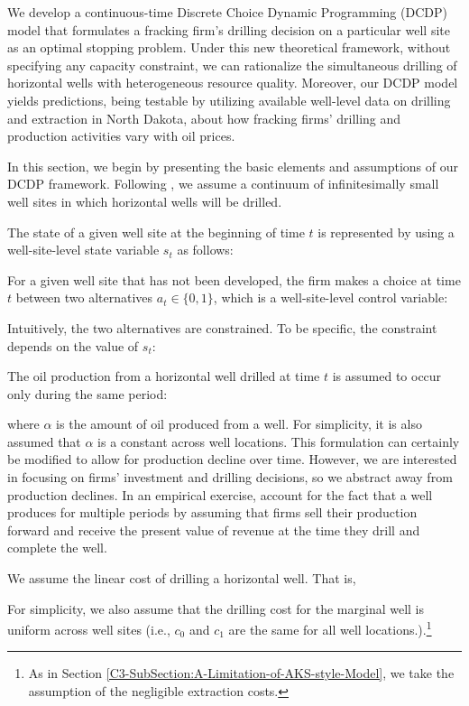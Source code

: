 We develop a continuous-time Discrete Choice Dynamic Programming (DCDP) model that formulates a fracking firm's drilling decision on a particular well site as an optimal stopping problem. Under this new theoretical framework, without specifying any capacity constraint, we can rationalize the simultaneous drilling of horizontal wells with heterogeneous resource quality.   
Moreover, our DCDP model yields predictions, being testable by utilizing available well-level data on drilling and extraction in North Dakota, about how fracking firms' drilling and production activities vary with oil prices. 

In this section, we begin by presenting the basic elements and assumptions of our DCDP framework. Following \cite{Hotelling-under-Pressure_AKS_2018}, we assume a continuum of infinitesimally small well sites in which horizontal wells will be drilled. 

The state of a given well site at the beginning of time $t$ is represented by using a well-site-level state variable $s_{t}$ as follows:


For a given well site that has not been developed, the firm makes a choice at time $t$ between two alternatives $a_{t} \in \{ 0, 1 \}$, which is a well-site-level control variable:

Intuitively, the two alternatives are constrained. To be specific, the constraint depends on the value of $s_{t}$:


The oil production from a horizontal well drilled at time $t$ is assumed to occur only during the same period:

where $\alpha$ is the amount of oil produced from a well. For simplicity, it is also assumed that $\alpha$ is a constant across well locations. This formulation can certainly be modified to allow for production decline over time. However, we are interested in focusing on firms' investment and drilling decisions, so we abstract away from production declines. In an empirical exercise, account for the fact that a well produces for multiple periods by assuming that firms sell their production forward and receive the present value of revenue at the time they drill and complete the well. 

We assume the linear cost of drilling a horizontal well. That is,

For simplicity, we also assume that the drilling cost for the marginal well is uniform across well sites (i.e., $c_{0}$ and $c_{1}$ are the same for all well locations.).\footnote{As in Section \ref{C3-SubSection:A-Limitation-of-AKS-style-Model}, we take the assumption of the negligible extraction costs.} 

